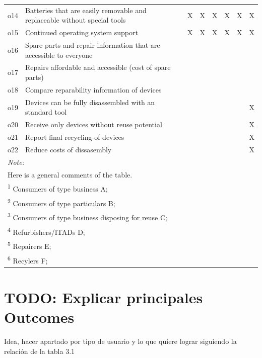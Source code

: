 \documentclass[
]{book}
\begin{document}
\begin{table}
{\begin{tabular}[t]{llllllll}
o14 & Batteries that are easily removable and replaceable without special tools & X & X & X & X & X & X\\
o15 & Continued operating system support & X & X & X & X & X & X\\
o16 & Spare parts and repair information that are accessible to everyone &  &  &  &  &  & \\
o17 & Repairs affordable and accessible (cost of spare parts) &  &  &  &  &  & \\
o18 & Compare reparability information of devices &  &  &  &  &  & \\
o19 & Devices can be fully disassembled with an standard tool &  &  &  &  &  & X\\
o20 & Receive only devices without reuse potential &  &  &  &  &  & X\\
o21 & Report final recycling of devices &  &  &  &  &  & X\\
o22 & Reduce costs of dissasembly &  &  &  &  &  & X\\
\bottomrule
\multicolumn{8}{l}{\rule{0pt}{1em}\textit{Note: }}\\
\multicolumn{8}{l}{\rule{0pt}{1em}Here is a general comments of the table. }\\
\multicolumn{8}{l}{\rule{0pt}{1em}\textsuperscript{1} Consumers of type business A; }\\
\multicolumn{8}{l}{\rule{0pt}{1em}\textsuperscript{2} Consumers of type particulars B; }\\
\multicolumn{8}{l}{\rule{0pt}{1em}\textsuperscript{3} Consumers of type business disposing for reuse C; }\\
\multicolumn{8}{l}{\rule{0pt}{1em}\textsuperscript{4} Refurbishers/ITADs D; }\\
\multicolumn{8}{l}{\rule{0pt}{1em}\textsuperscript{5} Repairers E; }\\
\multicolumn{8}{l}{\rule{0pt}{1em}\textsuperscript{6} Recylers F; }\\
\end{tabular}}
\end{table}

\hypertarget{todo-explicar-principales-outcomes}{%
\section{TODO: Explicar principales Outcomes}\label{todo-explicar-principales-outcomes}}

Idea, hacer apartado por tipo de usuario y lo que quiere lograr siguiendo la relación de la tabla 3.1
\end{document}
